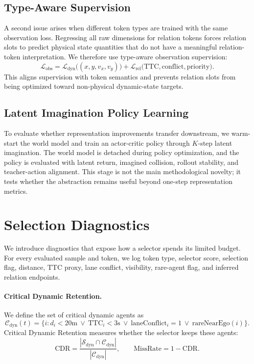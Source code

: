 \documentclass[10pt]{article}
\newcommand{\cdyn}{\mathcal{C}_{\mathrm{dyn}}}
\newcommand{\sdyn}{\mathcal{S}_{\mathrm{dyn}}}
\newcommand{\miss}{\mathrm{MissRate}}
\newcommand{\cdr}{\mathrm{CDR}}
\begin{document}
\subsection{Type-Aware Supervision}
A second issue arises when different token types are trained with the same observation loss. Regressing all raw dimensions for relation tokens forces relation slots to predict physical state quantities that do not have a meaningful relation-token interpretation. We therefore use type-aware observation supervision:
\begin{equation}
\mathcal{L}_{\mathrm{obs}} =
\mathcal{L}_{\mathrm{dyn}}\big((x,y,v_x,v_y)\big) +
\mathcal{L}_{\mathrm{rel}}\big(\mathrm{TTC}, \mathrm{conflict}, \mathrm{priority}\big).
\end{equation}
This aligns supervision with token semantics and prevents relation slots from being optimized toward non-physical dynamic-state targets.

\subsection{Latent Imagination Policy Learning}
To evaluate whether representation improvements transfer downstream, we warm-start the world model and train an actor-critic policy through $K$-step latent imagination. The world model is detached during policy optimization, and the policy is evaluated with latent return, imagined collision, rollout stability, and teacher-action alignment. This stage is not the main methodological novelty; it tests whether the abstraction remains useful beyond one-step representation metrics.

\section{Selection Diagnostics}
We introduce diagnostics that expose how a selector spends its limited budget. For every evaluated sample and token, we log token type, selector score, selection flag, distance, TTC proxy, lane conflict, visibility, rare-agent flag, and inferred relation endpoints.

\paragraph{Critical Dynamic Retention.}
We define the set of critical dynamic agents as
\begin{equation}
\cdyn(t)=\{i: d_i < 20\mathrm{m} \ \lor\ \mathrm{TTC}_i < 3\mathrm{s} \ \lor\ \mathrm{laneConflict}_i=1 \ \lor\ \mathrm{rareNearEgo}(i)\}.
\end{equation}
Critical Dynamic Retention measures whether the selector keeps these agents:
\begin{equation}
    \cdr = \frac{|\sdyn \cap \cdyn|}{|\cdyn|}, \qquad \miss = 1-\cdr.
\end{equation}
\end{document}
